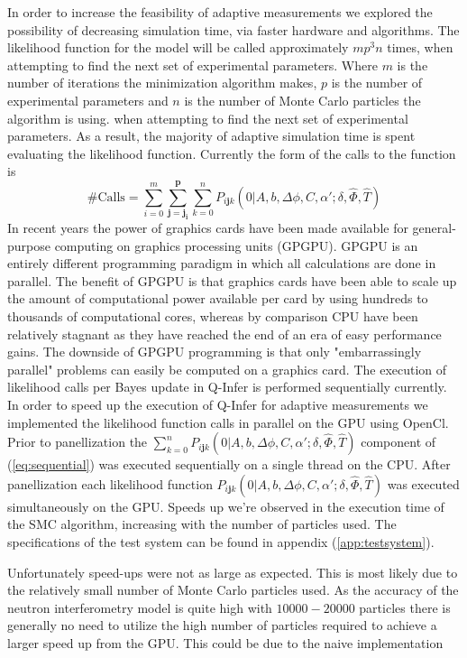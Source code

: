 In order to increase the feasibility of adaptive measurements we explored the possibility of decreasing simulation time, via faster hardware and algorithms. The likelihood function for the model will be called approximately $mp^3n$ times, when attempting to find the next set of experimental parameters. Where $m$ is the number of iterations the minimization algorithm makes, $p$ is the number of experimental parameters and $n$ is the number of Monte Carlo particles the algorithm is using. when attempting to find the next set of experimental parameters. As a result, the majority of adaptive simulation time is spent evaluating the likelihood function. Currently the form of the calls to the function is
\begin{equation}
\text{\# Calls} = \sum \limits_{i=0}^m \sum \limits_{\mathbf{j}=\mathbf{j_i}}^\mathbf{p} \sum \limits_{k=0}^n P_{i\mathbf{j}k}(0|A,b,\Delta\phi,C,\alpha';\delta,\hat{\Phi},\hat{T})
\label{eq:sequential}
\end{equation} 
In recent years the power of graphics cards have been made available for general-purpose computing on graphics processing units (GPGPU). GPGPU is an entirely different programming paradigm in which all calculations are done in parallel. The benefit of GPGPU is that graphics cards have been able to scale up the amount of computational power available per card by using hundreds to thousands of computational cores, whereas by comparison CPU have been relatively stagnant as they have reached the end of an era of easy performance gains.\cite{gpuvscpu} The downside of GPGPU programming is that only "embarrassingly parallel" problems can easily be computed on a graphics card. The execution of likelihood calls per Bayes update in Q-Infer is performed sequentially currently. In order to speed up the execution of Q-Infer for adaptive measurements we implemented the likelihood function calls in parallel on the GPU using OpenCl.\cite{opencl} Prior to panellization the $\sum \limits_{k=0}^n P_{i\mathbf{j}k}(0|A,b,\Delta\phi,C,\alpha';\delta,\hat{\Phi},\hat{T})$ component of (\ref{eq:sequential}) was executed sequentially on a single thread on the CPU. After panellization each likelihood function $P_{i\mathbf{j}k}(0|A,b,\Delta\phi,C,\alpha';\delta,\hat{\Phi},\hat{T})$ was executed simultaneously on the GPU. Speeds up we're observed in the execution time of the SMC algorithm, increasing with the number of particles used. The specifications of the test system can be found in appendix (\ref{app:testsystem}).  

Unfortunately speed-ups were not as large as expected. This is most likely due to the relatively small number of Monte Carlo particles used. As the accuracy of the neutron interferometry model is quite high with $10000-20000$ particles there is generally no need to utilize the high number of particles required to achieve a larger speed up from the GPU. This could be due to the naive implementation